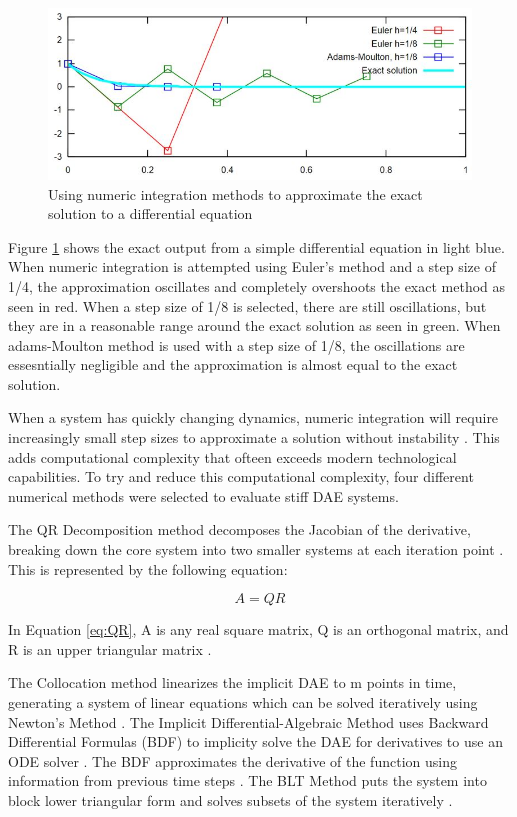 \begin{figure}[!htb]
	\centering
	\includegraphics[width=\linewidth]{stiffsystem}
	\caption{Using numeric integration methods to approximate the exact solution to a differential equation}\label{fig:stiffsystem}
	\endminipage
\end{figure}
Figure \ref{fig:stiffsystem} shows the exact output from a simple differential equation in light blue. 
When numeric integration is attempted using Euler's method and a step size of 1/4, the approximation oscillates and completely overshoots the exact method as seen in red. 
When a step size of 1/8 is selected, there are still oscillations, but they are in a reasonable range around the exact solution as seen in green. 
When adams-Moulton method is used with a step size of 1/8, the oscillations are essesntially negligible and the approximation is almost equal to the exact solution.


\par
When a system has quickly changing dynamics, numeric integration will require increasingly small step sizes to approximate a solution without instability \cite{StiffSystem}. 
This adds computational complexity that ofteen exceeds modern technological capabilities. 
To try and reduce this computational complexity, four different numerical methods were selected to evaluate stiff DAE systems.

The QR Decomposition method decomposes the Jacobian of the derivative, breaking down the core system into two smaller systems at each iteration point \cite{Methods}.
This is represented by the following equation:

\begin{equation}
\label{eq:QR}
A = QR
\end{equation}

In Equation \ref{eq:QR}, A is any real square matrix, Q is an orthogonal matrix, and R is an upper triangular matrix \cite{Methods}.

The Collocation method linearizes the implicit DAE to m points in time, generating a system of linear equations which can be solved iteratively using Newton's Method \cite{Methods}.
The Implicit Differential-Algebraic Method uses Backward Differential Formulas (BDF) to implicity solve the DAE for derivatives to use an ODE solver \cite{Methods}. 
The BDF approximates the derivative of the function using information from previous time steps \cite{Methods}.
The BLT Method puts the system into block lower triangular form and solves subsets of the system iteratively \cite{Methods}.

